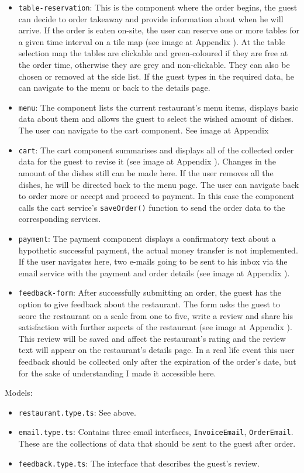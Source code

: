 \begin{itemize}
	\item \verb+table-reservation+: This is the component where the order begins, the guest can decide to order takeaway and provide information about when he will arrive. If the order is eaten on-site, the user can reserve one or more tables for a given time interval on a tile map (see image at Appendix ). At the table selection map the tables are clickable and green-coloured if they are free at the order time, otherwise they are grey and non-clickable. They can also be chosen or removed at the side list. If the guest types in the required data, he can navigate to the menu or back to the details page. 
	\item \verb+menu+: The component lists the current restaurant's menu items, displays basic data about them and allows the guest to select the wished amount of dishes. The user can navigate to the cart component. See image at Appendix 
	\item \verb+cart+: The cart component summarises and displays all of the collected order data for the guest to revise it (see image at Appendix ). Changes in the amount of the dishes still can be made here. If the user removes all the dishes, he will be directed back to the menu page. The user can navigate back to order more or accept and proceed to payment. In this case the component calls the cart service's \verb+saveOrder()+ function to send the order data to the corresponding services.
	\item \verb+payment+: The payment component displays a confirmatory text about a hypothetic successful payment, the actual money transfer is not implemented. If the user navigates here, two e-mails going to be sent to his inbox via the email service with the payment and order details (see image at Appendix ).
	\item \verb+feedback-form+: After successfully submitting an order, the guest has the option to give feedback about the restaurant. The form asks the guest to score the restaurant on a scale from one to five, write a review and share his satisfaction with further aspects of the restaurant (see image at Appendix ). This review will be saved and affect the restaurant's rating and the review text will appear on the restaurant's details page. In a real life event this user feedback should be collected only after the expiration of the order's date, but for the sake of understanding I made it accessible here.
\end{itemize}
Models:
\begin{itemize}
	\item \verb+restaurant.type.ts+: See above.
	\item \verb+email.type.ts+: Contains three email interfaces, \verb+InvoiceEmail+, \verb+OrderEmail+. These are the collections of data that should be sent to the guest after order. 
	\item \verb+feedback.type.ts+: The interface that describes the guest's review.
\end{itemize}
